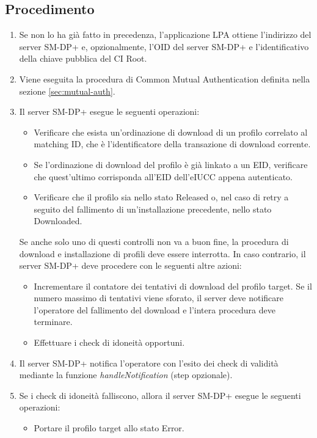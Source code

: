 \documentclass[10pt, twoside, openany]{book}
\begin{document}
\subsection{Procedimento}
\begin{enumerate}
\item Se non lo ha già fatto in precedenza, l'applicazione LPA ottiene l'indirizzo del server SM-DP+ e, opzionalmente, l'OID del server SM-DP+ e l'identificativo della chiave pubblica del CI Root.
\item Viene eseguita la procedura di Common Mutual Authentication definita nella sezione \ref{sec:mutual-auth}.
\item Il server SM-DP+ esegue le seguenti operazioni:
\begin{itemize}[itemsep=0pt]
\item Verificare che esista un'ordinazione di download di un profilo correlato al matching ID, che è l'identificatore della transazione di download corrente.
\item Se l'ordinazione di download del profilo è già linkato a un EID, verificare che quest'ultimo corrisponda all'EID dell'eIUCC appena autenticato.
\item Verificare che il profilo sia nello stato Released o, nel caso di retry a seguito del fallimento di un'installazione precedente, nello stato Downloaded.
\end{itemize}
Se anche solo uno di questi controlli non va a buon fine, la procedura di download e installazione di profili deve essere interrotta. In caso contrario, il server SM-DP+ deve procedere con le seguenti altre azioni:
\begin{itemize}[itemsep=0pt]
\item Incrementare il contatore dei tentativi di download del profilo target. Se il numero massimo di tentativi viene sforato, il server deve notificare l'operatore del fallimento del download e l'intera procedura deve terminare.
\item Effettuare i check di idoneità opportuni.
\end{itemize}
\item Il server SM-DP+ notifica l'operatore con l'esito dei check di validità mediante la funzione \textit{handleNotification} (step opzionale).
\item Se i check di idoneità falliscono, allora il server SM-DP+ esegue le seguenti operazioni:
\begin{itemize}[itemsep=0pt]
\item Portare il profilo target allo stato Error.

\end{itemize}
\end{enumerate}
\end{document}
